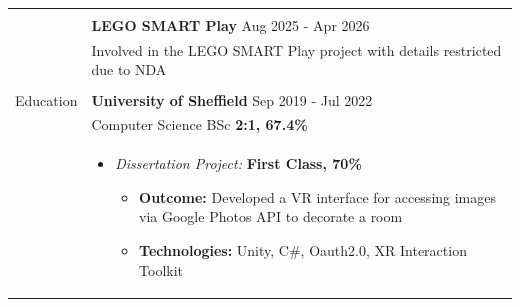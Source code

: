 \documentclass[11pt]{article}
\begin{document}
\begin{minipage}[t][0pt]{\linewidth}
\begin{tabular}[t]{p{2cm} p{14cm}}
	               \\ & \\ &


	               \textbf{LEGO SMART Play}  \hfill Aug 2025 - Apr 2026                                                                                                                                                                                                                                                                                               \\ &
	               Involved in the LEGO SMART Play project with details restricted due to NDA

	               \\ \\

	               {Education}         &

	               \textbf{University of Sheffield} \hfill Sep 2019 - Jul 2022                                                                                                                                                                                                                                                                                        \\ &
	               Computer Science BSc \hfill \textbf{2:1, 67.4\%}                                                                                                                                                                                                                                                                                                   \\ &

	               \begin{itemize}
		               \renewcommand{\labelitemi}{$\diamond$}
		               \item \textit{Dissertation Project:} \hfill \textbf{First Class, 70\%}
		                     \begin{itemize}
			                     \renewcommand{\labelitemii}{$\cdot$}
			                     \item \textbf{Outcome:} Developed a VR interface for accessing images via Google Photos API to decorate a room
			                     \item \textbf{Technologies:} Unity, C\#, Oauth2.0, XR Interaction Toolkit
		                     \end{itemize}

	               \end{itemize}


\end{tabular}
\end{minipage}
\end{document}
